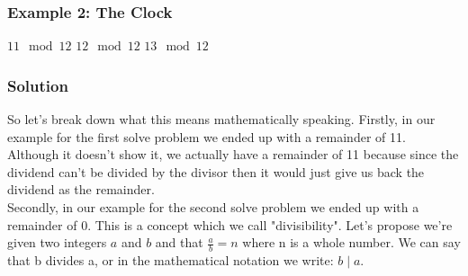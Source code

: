 \documentclass[12pt]{article}
\begin{document}
\subsubsection*{Example 2: The Clock}

\begin{center}
     $11 \mod{12}$ \hfill {} $12 \mod{12}$ \hfill {} $13 \mod{12}$
\end{center}

\subsubsection*{Solution}
\begin{center}
     \hfill {} \hfill {}
\end{center}

\indent \indent So let's break down what this means mathematically speaking. Firstly, in our example for the first solve problem we ended up with a remainder of 11. Although it doesn't show it, we actually have a remainder of 11 because since the dividend can't be divided by the divisor then it would just give us back the dividend as the remainder. \\ 
\indent \indent Secondly, in our example for the second solve problem we ended up with a remainder of 0. This is a concept which we call "divisibility". Let's propose we're given two integers $a$ and $b$ and that $\frac{a}{b} = n$ where n is a whole number. We can say that b divides a, or in the mathematical notation we write: $b \mid a$.
\end{document}
